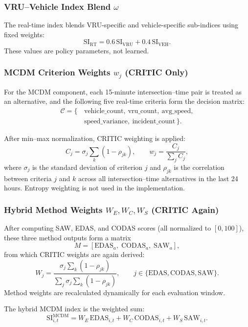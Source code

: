 \documentclass[conference]{IEEEtran}
\begin{document}
\subsubsection{VRU--Vehicle Index Blend $\omega$}
The real-time index blends VRU-specific and vehicle-specific sub-indices using 
fixed weights:
\[
\mathrm{SI}_{\mathrm{RT}}
=
0.6\,\mathrm{SI}_{\mathrm{VRU}}
+
0.4\,\mathrm{SI}_{\mathrm{VEH}}.
\]
These values are policy parameters, not learned.

\subsubsection{MCDM Criterion Weights $w_j$ (CRITIC Only)}
For the MCDM component, each 15-minute intersection--time pair is treated as an 
alternative, and the following five real-time criteria form the decision matrix:
\begin{equation}
\begin{aligned}
\mathcal{C} = \{\, 
&\text{vehicle\_count},\ \text{vru\_count},\ \text{avg\_speed},\\
&\text{speed\_variance},\ \text{incident\_count}
\,\}.
\end{aligned}
\end{equation}

After min--max normalization, CRITIC weighting is applied:
\[
C_j
=
\sigma_j
\sum_{k}(1-\rho_{jk}),\qquad
w_j
=
\frac{C_j}{\sum_j C_j},
\]
where $\sigma_j$ is the standard deviation of criterion $j$ and $\rho_{jk}$ is 
the correlation between criteria $j$ and $k$ across all intersection--time 
alternatives in the last 24 hours.  
Entropy weighting is not used in the implementation.

\subsubsection{Hybrid Method Weights $W_E,W_C,W_S$ (CRITIC Again)}
After computing SAW, EDAS, and CODAS scores (all normalized to $[0,100]$), these 
three method outputs form a matrix
\[
M = [\mathrm{EDAS}_a,\;\mathrm{CODAS}_a,\;\mathrm{SAW}_a],
\]
from which CRITIC weights are again derived:
\[
W_j
=
\frac{\sigma_j \sum_k(1-\rho_{jk})}
     {\sum_j \sigma_j \sum_k(1-\rho_{jk})},
\qquad 
j\in\{\mathrm{EDAS},\mathrm{CODAS},\mathrm{SAW}\}.
\]
Method weights are recalculated dynamically for each evaluation window.

The hybrid MCDM index is the weighted sum:
\[
\mathrm{SI}^{\mathrm{MCDM}}_{i,t}
=
W_E \,\mathrm{EDAS}_{i,t}
+
W_C \,\mathrm{CODAS}_{i,t}
+
W_S \,\mathrm{SAW}_{i,t}.
\]
\end{document}
